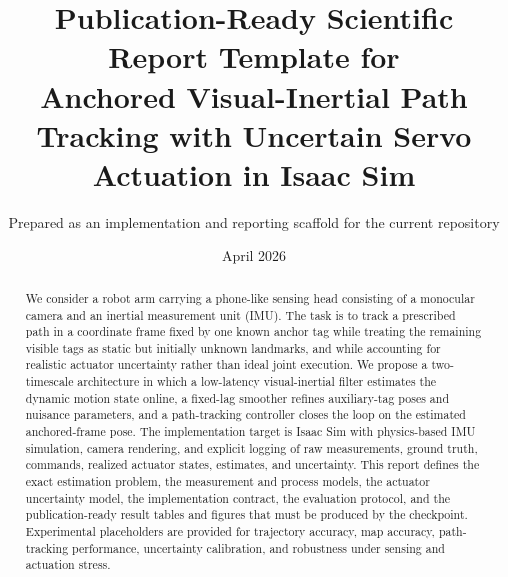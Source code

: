 \documentclass[11pt]{article}
\title{Publication-Ready Scientific Report Template for \\ Anchored Visual-Inertial Path Tracking with Uncertain Servo Actuation in Isaac Sim}
\author{Prepared as an implementation and reporting scaffold for the current repository}
\date{April 2026}
\begin{document}
\maketitle

\begin{center}
\end{center}

\begin{abstract}
We consider a robot arm carrying a phone-like sensing head consisting of a monocular camera and an inertial measurement unit (IMU). The task is to track a prescribed path in a coordinate frame fixed by one known anchor tag while treating the remaining visible tags as static but initially unknown landmarks, and while accounting for realistic actuator uncertainty rather than ideal joint execution. We propose a two-timescale architecture in which a low-latency visual-inertial filter estimates the dynamic motion state online, a fixed-lag smoother refines auxiliary-tag poses and nuisance parameters, and a path-tracking controller closes the loop on the estimated anchored-frame pose. The implementation target is Isaac Sim with physics-based IMU simulation, camera rendering, and explicit logging of raw measurements, ground truth, commands, realized actuator states, estimates, and uncertainty. This report defines the exact estimation problem, the measurement and process models, the actuator uncertainty model, the implementation contract, the evaluation protocol, and the publication-ready result tables and figures that must be produced by the checkpoint. Experimental placeholders are provided for trajectory accuracy, map accuracy, path-tracking performance, uncertainty calibration, and robustness under sensing and actuation stress.\end{abstract}
\end{document}
